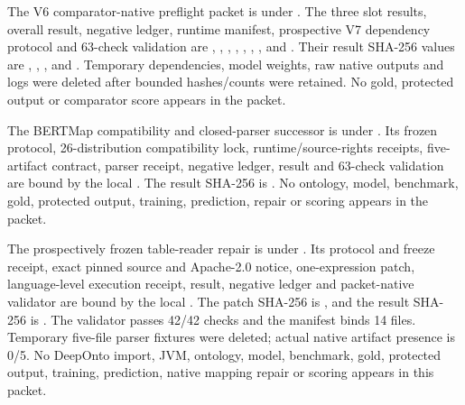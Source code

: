 The V6 comparator-native preflight packet is under
.  The three
slot results, overall result, negative ledger, runtime manifest, prospective V7
dependency protocol and 63-check validation are
, ,
, ,
, ,
, and
.  Their result SHA-256 values are
,
,
,
and .
Temporary dependencies, model weights, raw native outputs and logs were
deleted after bounded hashes/counts were retained. No gold, protected output
or comparator score appears in the packet.

The BERTMap compatibility and closed-parser successor is under
. Its frozen
protocol, 26-distribution compatibility lock, runtime/source-rights receipts,
five-artifact contract, parser receipt, negative ledger, result and 63-check
validation are bound by the local . The result SHA-256 is
.
No ontology, model, benchmark, gold, protected output, training, prediction,
repair or scoring appears in the packet.

The prospectively frozen table-reader repair is under
. Its protocol
and freeze receipt, exact pinned source and Apache-2.0 notice, one-expression
patch, language-level execution receipt, result, negative ledger and
packet-native validator are bound by the local . The patch
SHA-256 is
,
and the result SHA-256 is
.
The validator passes 42/42 checks and the manifest binds 14 files. Temporary
five-file parser fixtures were deleted; actual native artifact presence is
0/5. No DeepOnto import, JVM, ontology, model, benchmark, gold, protected
output, training, prediction, native mapping repair or scoring appears in this
packet.

